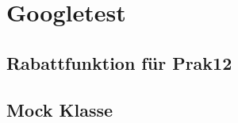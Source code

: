 \section{Googletest}
\subsection{Rabattfunktion für Prak12}
\begin{minipage}[t]{0.48\textwidth}


\end{minipage}
\hfill
\begin{minipage}[t]{0.49\textwidth}


\end{minipage}

\subsection{Mock Klasse}

\begin{minipage}[t]{0.48\textwidth}



\end{minipage}
\hfill
\begin{minipage}[t]{0.49\textwidth}




\end{minipage}
